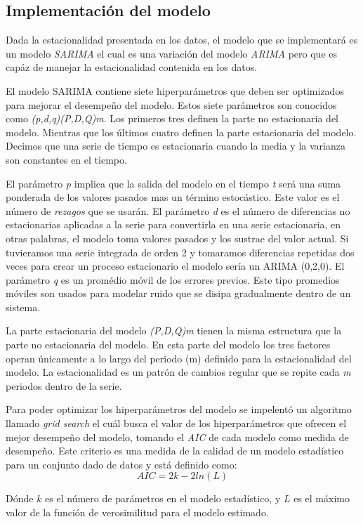 \subsection*{Implementación del modelo}
Dada la estacionalidad presentada en los datos, el modelo que se implementará es un modelo \emph{SARIMA} el cual es una variación del modelo \emph{ARIMA} pero que es capáz de manejar la estacionalidad contenida en los datos.

El modelo SARIMA contiene siete hiperparámetros que deben ser optimizados para mejorar el desempeño del modelo. Estos siete parámetros son conocidos como \emph{(p,d,q)(P,D,Q)m}. Los primeros tres definen la parte no estacionaria del modelo. Mientras que los últimos cuatro definen la parte estacionaria del modelo.  Decimos que una serie de tiempo es estacionaria cuando la media y la varianza son constantes en el tiempo.

El parámetro \emph{p} implica que la salida del modelo en el tiempo \emph{t} será una suma ponderada de los valores pasados mas un término estocástico. Este valor es el número de \emph{rezagos} que se usarán. El parámetro \emph{d} es el número de diferencias no estacionarias aplicadas a la serie para convertirla en una serie estacionaria, en otras palabras, el modelo toma valores pasados y los sustrae del valor actual. Si tuvieramos una serie integrada de orden 2 y tomaramos diferencias repetidas dos veces para crear un proceso estacionario el modelo sería un ARIMA (0,2,0). El parámetro \emph{q} es un promédio móvil de los errores previos. Este tipo promedios móviles son usados para modelar ruido que se disipa gradualmente dentro de un sistema.

La parte estacionaria del modelo \emph{(P,D,Q)m} tienen la misma estructura que la parte no estacionaria del modelo. En esta parte del modelo los tres factores operan únicamente a lo largo del periodo (m) definido para la estacionalidad del modelo. La estacionalidad es un patrón de cambios regular que se repite cada \emph{m} periodos dentro de la serie.

Para poder optimizar los hiperparámetros del modelo se impelentó un algoritmo llamado \emph{grid search} el cuál busca el valor de los hiperparámetros que ofrecen el mejor desempeño del modelo, tomando el \emph{AIC} de cada modelo como medida de desempeño. Este criterio es una medida de la calidad de un modelo estadístico para un conjunto dado de datos y está definido como: $$AIC = 2k - 2ln(L)$$

Dónde $k$ es el número de parámetros en el modelo estadístico, y $L$ es el máximo valor de la función de verosimilitud para el modelo estimado.

